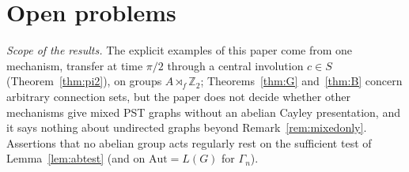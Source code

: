 \documentclass[preprint,11pt]{elsarticle}
\theoremstyle{definition}
\theoremstyle{remark}
\newcommand{\Z}{\mathbb Z}
\begin{document}
\section{Open problems}\label{sec:open}

\emph{Scope of the results.} The explicit examples of this paper come from one mechanism, transfer at time $\pi/2$ through a central involution $c\in S$ (Theorem~\ref{thm:pi2}), on groups $A\rtimes_f\Z_2$; Theorems~\ref{thm:G} and~\ref{thm:B} concern arbitrary connection sets, but the paper does not decide whether other mechanisms give mixed PST graphs without an abelian Cayley presentation, and it says nothing about undirected graphs beyond Remark~\ref{rem:mixedonly}. Assertions that no abelian group acts regularly rest on the sufficient test of Lemma~\ref{lem:abtest} (and on $\mathrm{Aut}=L(G)$ for $\Gamma_n$).
\end{document}
